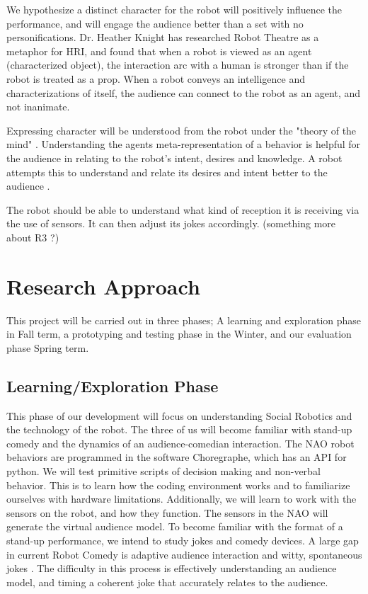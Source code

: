 \documentclass[onecolumn, draftclsnofoot,10pt, compsoc]{IEEEtran}
\begin{document}
We hypothesize a distinct character for the robot will positively influence the performance, and will engage the audience better than a set with no personifications. Dr. Heather Knight has researched Robot Theatre as a metaphor for HRI, and found that when a robot is viewed as an agent (characterized object), the interaction arc with a human is stronger than if the robot is treated as a prop. When a robot conveys an intelligence and characterizations of itself, the audience can connect to the robot as an agent, and not inanimate.

Expressing character will be understood from the robot under the "theory of the mind" \cite{leslie}. Understanding the agents meta-representation of a behavior is helpful for the audience in relating to the robot's intent, desires and knowledge. A robot attempts this to understand and relate its desires and intent better to the audience \cite{theoryOfMindRobots}.

The robot should be able to understand what kind of reception it is receiving via the use of sensors. It can then adjust its jokes accordingly. (something more about R3 ?)

\section{Research Approach}
This project will be carried out in three phases; A learning and exploration phase in Fall term, a prototyping and testing phase in the Winter, and our evaluation phase Spring term.

\subsection{Learning/Exploration Phase}
This phase of our development will focus on understanding Social Robotics and the technology of the robot. The three of us will become familiar with stand-up comedy and the dynamics of an audience-comedian interaction. The NAO robot behaviors are programmed in the software Choregraphe, which has an API for python. We will test primitive scripts of decision making and non-verbal behavior. This is to learn how the coding environment works and to familiarize ourselves with hardware limitations. Additionally, we will learn to work with the sensors on the robot, and how they function. The sensors in the NAO will generate the virtual audience model. To become familiar with the format of a stand-up performance, we intend to study jokes and comedy devices. A large gap in current Robot Comedy is adaptive audience interaction and witty, spontaneous jokes \cite{KatevasRobot:2014}. The difficulty in this process is effectively understanding an audience model, and timing a coherent joke that accurately relates to the audience.
\end{document}
